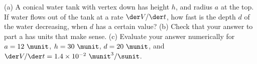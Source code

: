 (a)
A conical water tank with vertex down
has height $h$, and radius $a$ at the top.
If water flows out of the tank at a
rate $\der V/\der t$, how fast is the depth $d$ of
the water decreasing, when $d$ has a certain value?
(b) Check that your answer to part a has units that
make sense.
(c) Evaluate your answer numerically for $a=12\ \munit$,
$h=30\ \munit$, $d=20\ \munit$, and $\der V/\der t=1.4\times10^{-2}\ \munit^3/\sunit$.
\answercheck
